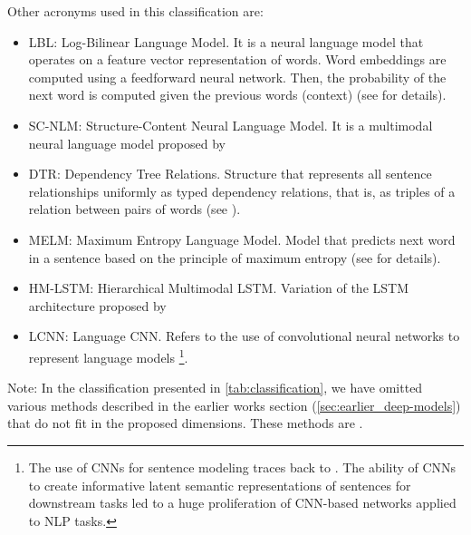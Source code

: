 Other acronyms used in this classification are:
\begin{itemize}
\item LBL: Log-Bilinear Language Model. It is a neural language model that operates on a feature vector representation of words. Word embeddings are computed using a feedforward neural network. Then, the probability of the next word is computed given the previous words (context) (see \citep{Mnih2007} for details).
\item SC-NLM: Structure-Content Neural Language Model. It is a multimodal neural language model proposed by \citep{Kiros2014a}
\item DTR: Dependency Tree Relations. Structure that represents all sentence relationships uniformly as typed dependency relations, that is, as triples of a relation between pairs of words (see \citep{DeMarneffe2006}).
\item MELM: Maximum Entropy Language Model. Model that predicts next word in a sentence based on the principle of maximum entropy (see \citep{Berger1996} for details).
\item HM-LSTM: Hierarchical Multimodal LSTM. Variation of the LSTM architecture proposed by \citet{Niu2017}
\item LCNN: Language CNN. Refers to the use of convolutional neural networks to represent language models \footnote{The use of CNNs for sentence modeling traces back to \citet{Collobert2008}. The ability of CNNs to create informative latent semantic representations of sentences for downstream tasks  \citet{Collobert2011,Kalchbrenner2014,Kim2014} led to a huge proliferation of CNN-based networks applied to NLP tasks.}. 
\end{itemize}

Note: In the classification presented in \cref{tab:classification}, we have omitted various methods described in the earlier works section (\cref{sec:earlier_deep-models}) that do not fit in the proposed dimensions. These methods are \citet{Socher2014, Lebret2015a, Lebret2015b, Yagcioglu2015}.

